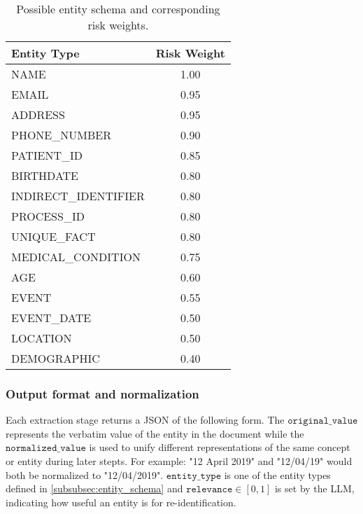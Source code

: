 \begin{table}[h!]
    \centering
    \begin{tabular}{lc}
        \toprule
        \textbf{Entity Type} & \textbf{Risk Weight} \\
        \midrule
        NAME                 & 1.00                 \\
        EMAIL                & 0.95                 \\
        ADDRESS              & 0.95                 \\
        PHONE\_NUMBER        & 0.90                 \\
        PATIENT\_ID          & 0.85                 \\
        BIRTHDATE            & 0.80                 \\
        INDIRECT\_IDENTIFIER & 0.80                 \\
        PROCESS\_ID          & 0.80                 \\
        UNIQUE\_FACT         & 0.80                 \\
        MEDICAL\_CONDITION   & 0.75                 \\
        AGE                  & 0.60                 \\
        EVENT                & 0.55                 \\
        EVENT\_DATE          & 0.50                 \\
        LOCATION             & 0.50                 \\
        DEMOGRAPHIC          & 0.40                 \\
        \bottomrule
    \end{tabular}
    \caption{Possible entity schema and corresponding risk weights.}
    \label{tab:entity-weight-schema}
\end{table}

\subsubsection{Output format and normalization}
Each extraction stage returns a JSON of the following form. The $\texttt{original\_value}$ represents the verbatim value of the entity in the document while the $\texttt{normalized\_value}$ is used to unify different representations of the same concept or entity during later stepts. For example: "12 April 2019" and "12/04/19" would both be normalized to "12/04/2019". $\texttt{entity\_type}$ is one of the entity types defined in \ref{subsubsec:entity_schema} and $\texttt{relevance}\in[0,1]$ is set by the LLM, indicating how useful an entity is for re-identification.

